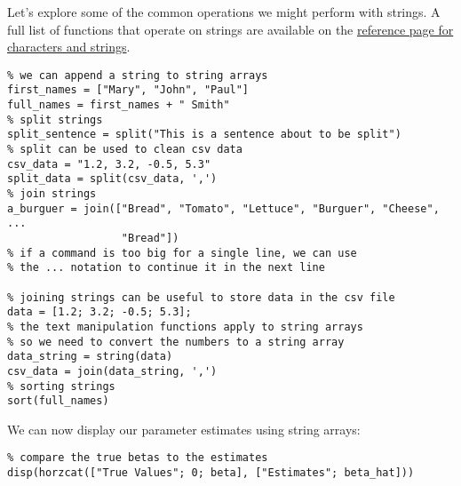 \documentclass[12pt, a4paper]{article}
\begin{document}
Let's explore some of the common operations we might perform with strings.
A full list of functions that operate on strings are available on the \href{https://www.mathworks.com/help/matlab/characters-and-strings.html}{reference page for characters and strings}.
\lstset{language=matlab,label= ,caption= ,captionpos=b,firstnumber=1,numbers=left,style=Matlab-editor}
\begin{lstlisting}
% we can append a string to string arrays
first_names = ["Mary", "John", "Paul"]
full_names = first_names + " Smith"
% split strings
split_sentence = split("This is a sentence about to be split")
% split can be used to clean csv data
csv_data = "1.2, 3.2, -0.5, 5.3"
split_data = split(csv_data, ',')
% join strings
a_burguer = join(["Bread", "Tomato", "Lettuce", "Burguer", "Cheese", ...
                  "Bread"])
% if a command is too big for a single line, we can use
% the ... notation to continue it in the next line

% joining strings can be useful to store data in the csv file
data = [1.2; 3.2; -0.5; 5.3];
% the text manipulation functions apply to string arrays
% so we need to convert the numbers to a string array
data_string = string(data)
csv_data = join(data_string, ',')
% sorting strings
sort(full_names)
\end{lstlisting}

We can now display our parameter estimates using string arrays:
\lstset{language=matlab,label= ,caption= ,captionpos=b,firstnumber=1,numbers=left,style=Matlab-editor}
\begin{lstlisting}
% compare the true betas to the estimates
disp(horzcat(["True Values"; 0; beta], ["Estimates"; beta_hat]))
\end{lstlisting}
\end{document}
